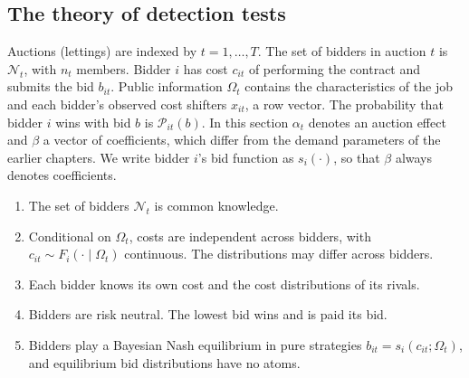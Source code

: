 

\subsection{The theory of detection tests}\label{sec:13-detection-theory}

Auctions (lettings) are indexed by $t = 1, \dots, T$. The set of bidders in auction $t$ is $\mathcal{N}_t$, with
$n_t$ members. Bidder $i$ has cost $c_{it}$ of performing the contract and submits the bid $b_{it}$. Public
information $\Omega_t$ contains the characteristics of the job and each bidder's observed cost shifters $x_{it}$, a
row vector. The probability that bidder $i$ wins with bid $b$ is $\mathcal{P}_{it}(b)$. In this section $\alpha_t$
denotes an auction effect and $\beta$ a vector of coefficients, which differ from the demand parameters of the
earlier chapters. We write bidder $i$'s bid function as $s_i(\cdot)$, so that $\beta$ always denotes coefficients.

\begin{assumption}\label{asm:13-competitive-bidding}
\leavevmode
\begin{enumerate}[label=(\alph*)]
\item The set of bidders $\mathcal{N}_t$ is common knowledge.
\item Conditional on $\Omega_t$, costs are independent across bidders, with $c_{it} \sim F_i(\cdot \mid \Omega_t)$
continuous. The distributions may differ across bidders.
\item Each bidder knows its own cost and the cost distributions of its rivals.
\item Bidders are risk neutral. The lowest bid wins and is paid its bid.
\item Bidders play a Bayesian Nash equilibrium in pure strategies $b_{it} = s_i(c_{it};\Omega_t)$, and equilibrium
bid distributions have no atoms.
\end{enumerate}
\end{assumption}

